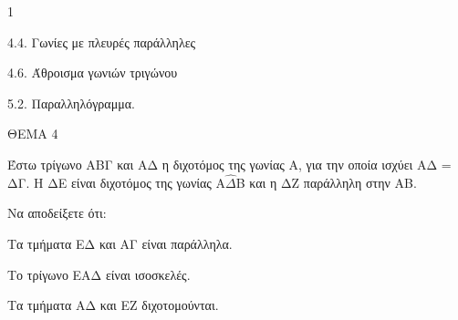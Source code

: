 \begin{ylh}{1}
    \item 4.4. Γωνίες με πλευρές παράλληλες
    \item 4.6. Άθροισμα γωνιών τριγώνου
    \item 5.2. Παραλληλόγραμμα.
\end{ylh}

ΘΕΜΑ 4

Έστω τρίγωνο ΑΒΓ και ΑΔ η διχοτόμος της γωνίας Α, για την οποία ισχύει ΑΔ = ΔΓ. Η ΔΕ είναι διχοτόμος της γωνίας Α$\widehat{\Delta}$Β και η ΔΖ παράλληλη στην ΑΒ.

Να αποδείξετε ότι:

\begin{alist}
\item Τα τμήματα ΕΔ και ΑΓ είναι παράλληλα. 

\item Το τρίγωνο ΕΑΔ είναι ισοσκελές. 

\item Τα τμήματα ΑΔ και ΕΖ διχοτομούνται. 


\end{alist}
